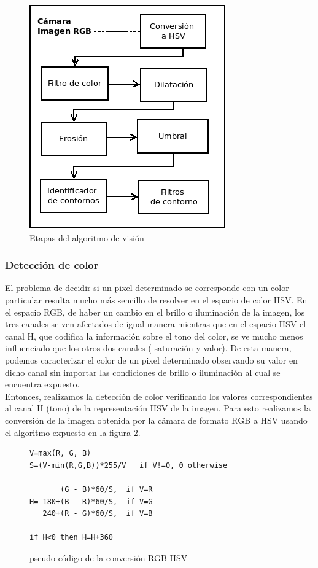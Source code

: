 \begin{figure}[tpb]
\begin{center}
  \includegraphics[scale=0.6]{figuras/vision-flow.png}
\end{center}
  \caption{Etapas del algoritmo de visión}
  \label{fig:alg_steps}
\end{figure}


\subsubsection{Detección de color}
El problema de decidir si un pixel determinado se corresponde con un color particular resulta mucho más sencillo de resolver en el espacio de color HSV. En el espacio RGB, de haber un cambio en el brillo o iluminación de la imagen, los tres canales se ven afectados de igual manera mientras que en el espacio HSV el canal H, que codifica la información sobre el tono del color, se ve mucho menos influenciado que los otros dos canales ( saturación y valor). De esta manera, podemos caracterizar el color de un pixel determinado observando su valor en dicho canal sin importar las condiciones de brillo o iluminación al cual se encuentra expuesto.
\\ \indent Entonces, realizamos la detección de color verificando los valores correspondientes al canal H (tono) de la representación HSV de la imagen. Para esto realizamos la conversión de la imagen obtenida por la cámara  de formato RGB a HSV usando el algoritmo expuesto en la figura \ref{code:hsv}.
\begin{figure}[tpb]
\begin{verbatim}
V=max(R, G, B)
S=(V-min(R,G,B))*255/V   if V!=0, 0 otherwise

       (G - B)*60/S,  if V=R
H= 180+(B - R)*60/S,  if V=G
   240+(R - G)*60/S,  if V=B

if H<0 then H=H+360
\end{verbatim}
\label{code:hsv}
\caption{pseudo-código de la conversión RGB-HSV}
\end{figure}

